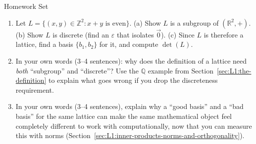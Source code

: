 \begin{exercisebox}{Homework Set}
\begin{enumerate}[leftmargin=*]
  \item Let $L = \{(x,y) \in \mathbb{Z}^2 : x + y \text{ is even}\}$. (a) Show $L$ is a subgroup of $(\mathbb{R}^2, +)$. (b) Show $L$ is discrete (find an $\varepsilon$ that isolates $\vec 0$). (c) Since $L$ is therefore a lattice, find a basis $\{b_1, b_2\}$ for it, and compute $\det(L)$.
  \item In your own words (3--4 sentences): why does the definition of a lattice need \emph{both} ``subgroup'' and ``discrete''? Use the $\mathbb{Q}$ example from Section~\ref{sec:L1:the-definition} to explain what goes wrong if you drop the discreteness requirement.
  \item In your own words (3--4 sentences), explain why a ``good basis'' and a ``bad basis'' for the same lattice can make the same mathematical object feel completely different to work with computationally, now that you can measure this with norms (Section~\ref{sec:L1:inner-products-norms-and-orthogonality}).
\end{enumerate}
\end{exercisebox}

